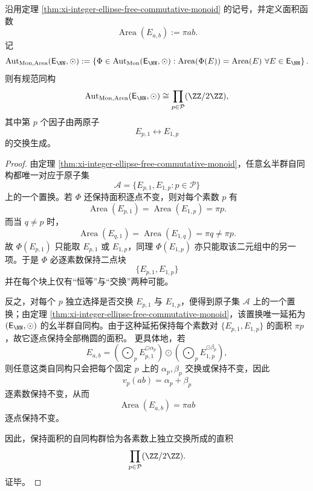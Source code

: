 \begin{corollary}[保持面积的整数轴对齐椭圆幺半群自同构仅由各素数轴交换组成]\label{cor:xi-integer-ellipse-area-preserving-automorphism-product}
沿用定理 \ref{thm:xi-integer-ellipse-free-commutative-monoid} 的记号，并定义面积函数
\[
\operatorname{Area}(E_{a,b}):=\pi ab.
\]
记
\[
\operatorname{Aut}_{\mathrm{Mon},\operatorname{Area}}(\mathsf E_{\NN},\odot)
:=
\left\{
\Phi\in \operatorname{Aut}_{\mathrm{Mon}}(\mathsf E_{\NN},\odot):
\operatorname{Area}(\Phi(E))=\operatorname{Area}(E)\ \forall E\in\mathsf E_{\NN}
\right\}.
\]
则有规范同构
\[
\operatorname{Aut}_{\mathrm{Mon},\operatorname{Area}}(\mathsf E_{\NN},\odot)
\cong
\prod_{p\in\mathcal P}(\ZZ/2\ZZ),
\]
其中第 \(p\) 个因子由两原子
\[
E_{p,1}\longleftrightarrow E_{1,p}
\]
的交换生成。
\end{corollary}
\begin{proof}
由定理 \ref{thm:xi-integer-ellipse-free-commutative-monoid}，任意幺半群自同构都唯一对应于原子集
\[
\mathcal A=\{E_{p,1},E_{1,p}:p\in\mathcal P\}
\]
上的一个置换。若 \(\Phi\) 还保持面积逐点不变，则对每个素数 \(p\) 有
\[
\operatorname{Area}(E_{p,1})=\operatorname{Area}(E_{1,p})=\pi p.
\]
而当 \(q\neq p\) 时，
\[
\operatorname{Area}(E_{q,1})=\operatorname{Area}(E_{1,q})=\pi q\neq \pi p.
\]
故 \(\Phi(E_{p,1})\) 只能取 \(E_{p,1}\) 或 \(E_{1,p}\)，同理 \(\Phi(E_{1,p})\) 亦只能取该二元组中的另一项。于是 \(\Phi\) 必逐素数保持二点块
\[
\{E_{p,1},E_{1,p}\}
\]
并在每个块上仅有“恒等”与“交换”两种可能。

反之，对每个 \(p\) 独立选择是否交换 \(E_{p,1}\) 与 \(E_{1,p}\)，便得到原子集 \(\mathcal A\) 上的一个置换；由定理 \ref{thm:xi-integer-ellipse-free-commutative-monoid}，该置换唯一延拓为 \((\mathsf E_{\NN},\odot)\) 的幺半群自同构。由于这种延拓保持每个素数对 \(\{E_{p,1},E_{1,p}\}\) 的面积 \(\pi p\)，故它逐点保持全部椭圆的面积。
更具体地，若
\[
E_{a,b}
=
\left(\bigodot_{p}E_{p,1}^{\odot \alpha_p}\right)
\odot
\left(\bigodot_{p}E_{1,p}^{\odot \beta_p}\right),
\]
则任意这类自同构只会把每个固定 \(p\) 上的 \(\alpha_p,\beta_p\) 交换或保持不变，因此
\[
v_p(ab)=\alpha_p+\beta_p
\]
逐素数保持不变，从而
\[
\operatorname{Area}(E_{a,b})=\pi ab
\]
逐点保持不变。

因此，保持面积的自同构群恰为各素数上独立交换所成的直积
\[
\prod_{p\in\mathcal P}(\ZZ/2\ZZ).
\]
证毕。
\end{proof}

